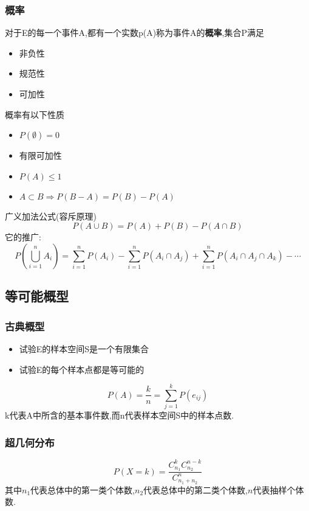 \documentclass{ctexart}
\begin{document}
\subsubsection{概率}
对于E的每一个事件A,都有一个实数p(A)称为事件A的\textbf{概率},集合P满足
\begin{itemize}
	\item 非负性
	\item 规范性
	\item 可加性
\end{itemize}
概率有以下性质
\begin{itemize}
	\item $P(\emptyset)=0$
	\item 有限可加性
	\item $P(A)\leq 1$
	\item $A \subset B\Rightarrow P(B-A)=P(B)-P(A)$
\end{itemize}
广义加法公式(容斥原理)
\begin{equation}
    P(A\cup B)=P(A)+P(B)-P(A\cap B)
\end{equation}
它的推广:
\begin{equation}
    P(\bigcup_{i=1}^nA_i)=\sum_{i=1}^nP(A_i)-\sum_{i=1}^nP(A_i\cap A_j)+\sum_{i=1}^nP(A_i\cap A_j\cap A_k)-\cdots
\end{equation}
\subsection{等可能概型}
\subsubsection{古典概型}
\begin{itemize}
    \item 试验E的样本空间S是一个有限集合
    \item 试验E的每个样本点都是等可能的
\end{itemize}
\begin{equation}
    P(A)=\frac{k}{n}=\sum_{j=1}^kP({e_{ij}})
\end{equation}
k代表A中所含的基本事件数,而n代表样本空间S中的样本点数.\\
\subsubsection{超几何分布}
\begin{equation}
	P(X=k)=\frac{C_{n_1}^kC_{n_2}^{n-k}}{C_{n_1+n_2}^n}
\end{equation}
其中$n_1$代表总体中的第一类个体数,$n_2$代表总体中的第二类个体数,$n$代表抽样个体数.\\
\end{document}

